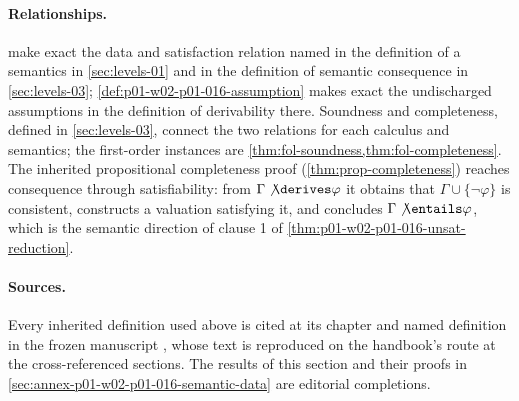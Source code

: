 \paragraph{Relationships.}
 make exact
the data and satisfaction relation named in the definition of a semantics in
\cref{sec:levels-01} and in the definition of semantic consequence in
\cref{sec:levels-03}; \cref{def:p01-w02-p01-016-assumption} makes exact the
undischarged assumptions in the definition of derivability there. Soundness
and completeness, defined in \cref{sec:levels-03}, connect the two relations
for each calculus and semantics; the first-order instances are
\cref{thm:fol-soundness,thm:fol-completeness}. The inherited propositional
completeness proof (\cref{thm:prop-completeness}) reaches consequence
through satisfiability: from \(\Gamma\not\derives\varphi\) it obtains that
\(\Gamma\cup\{\neg\varphi\}\) is consistent, constructs a valuation
satisfying it, and concludes \(\Gamma\not\entails\varphi\), which is the
semantic direction of clause 1 of
\cref{thm:p01-w02-p01-016-unsat-reduction}.

\paragraph{Sources.}
Every inherited definition used above is cited at its chapter and named
definition in the frozen manuscript
\cite{FrozenFormalLogicSemanticData}, whose text is reproduced on the
handbook's route at the cross-referenced sections. The results of this
section and their proofs in
\cref{sec:annex-p01-w02-p01-016-semantic-data} are editorial completions.
